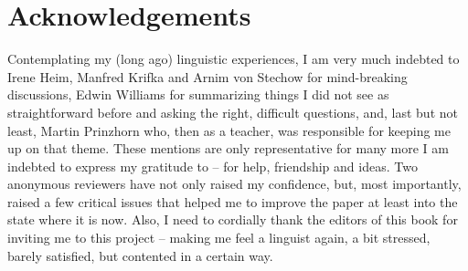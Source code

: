 \documentclass[output=paper,colorlinks,citecolor=brown,
]{langscibook}
\begin{document}
\section*{Acknowledgements}

Contemplating my (long ago) linguistic experiences, I am
very much indebted to Irene Heim, Manfred Krifka and Arnim von Stechow for mind-breaking discussions,
Edwin Williams for summarizing things I did not see as straightforward before and asking the right, difficult
questions, and, last but not least, Martin Prinzhorn who, then as a teacher, was responsible for keeping me up on that
theme. These mentions are only representative for many more I am indebted to express my gratitude to -- for help,
friendship and ideas. Two anonymous reviewers have not only raised my confidence, but, most importantly, raised a few
critical issues that helped me to improve the paper at least into the state where it is now. Also, I need to cordially thank the
editors of this book for inviting me to this project -- making
me feel a linguist again, a bit stressed, barely satisfied, but contented in a certain way.

\printbibliography[heading=subbibliography,notkeyword=this]
\end{document}
